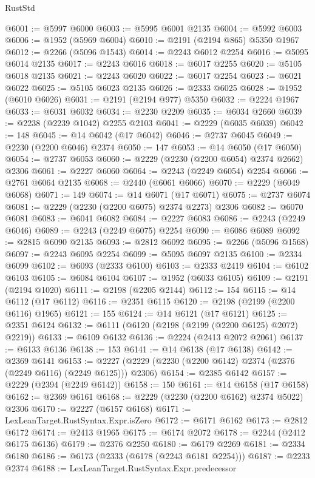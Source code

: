 \begin{lexlean}{RustStd}
\begin{coremodule}
{\begin{coremodule}
{{{{{{{{{{{{{{{{{{{{{{{{{{{{{{{{{{@6001 := @5997 @6000
@6003 := @5995 @6001 @2135
@6004 := @5992 @6003
@6006 := @1952 (@5969 @6004)
@6010 := @2191 (@2194 @865) @5350 @1967
@6012 := @2266 (@5096 @1543)
@6014 := @2243 @6012 @2254
@6016 := @5095 @6014 @2135
@6017 := @2243 @6016
@6018 := @6017 @2255
@6020 := @5105 @6018 @2135
@6021 := @2243 @6020
@6022 := @6017 @2254
@6023 := @6021 @6022
@6025 := @5105 @6023 @2135
@6026 := @2333 @6025
@6028 := @1952 (@6010 @6026)
@6031 := @2191 (@2194 @977) @5350
@6032 := @2224 @1967
@6033 := @6031 @6032
@6034 := @2230 @2209
@6035 := @6034 @2660
@6039 := @2238 (@2239 @1042) @2255 @2103
@6041 := @2229 (@6035 @6039)
@6042 := 148
@6045 := @14 @6042 (@17 @6042)
@6046 := @2737 @6045
@6049 := @2230 (@2200 @6046) @2374
@6050 := 147
@6053 := @14 @6050 (@17 @6050)
@6054 := @2737 @6053
@6060 := @2229 (@2230 (@2200 @6054) @2374 @2662) @2306
@6061 := @2227 @6060
@6064 := @2243 (@2249 @6054) @2254
@6066 := @2761 @6064 @2135
@6068 := @2440 (@6061 @6066)
@6070 := @2229 (@6049 @6068)
@6071 := 149
@6074 := @14 @6071 (@17 @6071)
@6075 := @2737 @6074
@6081 := @2229 (@2230 (@2200 @6075) @2374 @2273) @2306
@6082 := @6070 @6081
@6083 := @6041 @6082
@6084 := @2227 @6083
@6086 := @2243 (@2249 @6046)
@6089 := @2243 (@2249 @6075) @2254
@6090 := @6086 @6089
@6092 := @2815 @6090 @2135
@6093 := @2812 @6092
@6095 := @2266 (@5096 @1568)
@6097 := @2243 @6095 @2254
@6099 := @5095 @6097 @2135
@6100 := @2334 @6099
@6102 := @6093 (@2333 @6100)
@6103 := @2333 @2419
@6104 := @6102 @6103
@6105 := @6084 @6104
@6107 := @1952 (@6033 @6105)
@6109 := @2191 (@2194 @1020)
@6111 := @2198 (@2205 @2144)
@6112 := 154
@6115 := @14 @6112 (@17 @6112)
@6116 := @2351 @6115
@6120 := @2198 (@2199 (@2200 @6116) @1965)
@6121 := 155
@6124 := @14 @6121 (@17 @6121)
@6125 := @2351 @6124
@6132 := @6111 (@6120 (@2198 (@2199 (@2200 @6125) @2072) @2219))
@6133 := @6109 @6132
@6136 := @2224 (@2413 @2072 @2061)
@6137 := @6133 @6136
@6138 := 153
@6141 := @14 @6138 (@17 @6138)
@6142 := @2369 @6141
@6153 := @2227 (@2229 (@2230 (@2200 @6142) @2374 (@2376 (@2249 @6116) (@2249 @6125))) @2306)
@6154 := @2385 @6142
@6157 := @2229 (@2394 (@2249 @6142))
@6158 := 150
@6161 := @14 @6158 (@17 @6158)
@6162 := @2369 @6161
@6168 := @2229 (@2230 (@2200 @6162) @2374 @5022) @2306
@6170 := @2227 (@6157 @6168)
@6171 := LexLeanTarget.RustSyntax.Expr.isZero
@6172 := @6171 @6162
@6173 := @2812 @6172
@6174 := @2413 @1965
@6175 := @6174 @2072
@6178 := @2244 (@2412 @6175 @6136)
@6179 := @2376 @2250
@6180 := @6179 @2269
@6181 := @2334 @6180
@6186 := @6173 (@2333 (@6178 (@2243 @6181 @2254)))
@6187 := @2233 @2374
@6188 := LexLeanTarget.RustSyntax.Expr.predecessor
}}}}}}}}}}}}}}}}}}}}}}}}}}}}}}}}}}
\end{coremodule}}
\end{coremodule}
\end{lexlean}
